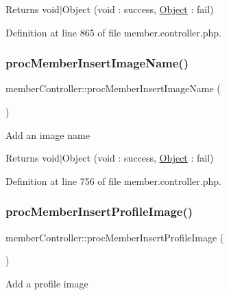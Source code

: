 \begin{DoxyReturn}{Returns}
void$\vert$\+Object (void \+: success, \hyperlink{classObject}{Object} \+: fail) 
\end{DoxyReturn}


Definition at line 865 of file member.\+controller.\+php.

\hypertarget{classmemberController_a5477f3466e28c09d13f182406893a3d6}{}\label{classmemberController_a5477f3466e28c09d13f182406893a3d6} 
\subsubsection{\texorpdfstring{proc\+Member\+Insert\+Image\+Name()}{procMemberInsertImageName()}}
{\footnotesize\ttfamily member\+Controller\+::proc\+Member\+Insert\+Image\+Name (\begin{DoxyParamCaption}{ }\end{DoxyParamCaption})}

Add an image name

\begin{DoxyReturn}{Returns}
void$\vert$\+Object (void \+: success, \hyperlink{classObject}{Object} \+: fail) 
\end{DoxyReturn}


Definition at line 756 of file member.\+controller.\+php.

\hypertarget{classmemberController_ac8b43955581e87f21c77ee741f633a66}{}\label{classmemberController_ac8b43955581e87f21c77ee741f633a66} 
\subsubsection{\texorpdfstring{proc\+Member\+Insert\+Profile\+Image()}{procMemberInsertProfileImage()}}
{\footnotesize\ttfamily member\+Controller\+::proc\+Member\+Insert\+Profile\+Image (\begin{DoxyParamCaption}{ }\end{DoxyParamCaption})}

Add a profile image

